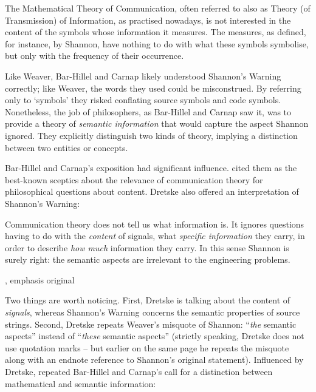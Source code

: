 \documentclass[12pt]{article}
\begin{document}
\begin{myquote}
The Mathematical Theory of Communication, often referred to also as Theory (of Transmission) of Information, as practised nowadays, is not interested in the content of the symbols whose information it measures. The measures, as defined, for instance, by Shannon, have nothing to do with what these symbols symbolise, but only with the frequency of their occurrence.
\par\hspace*{\fill}\citet[147]{bar-hillel1953semantic}
\end{myquote}

\noindent Like Weaver, Bar-Hillel and Carnap likely understood {\sc Shannon's Warning} correctly; like Weaver, the words they used could be misconstrued.
By referring only to `symbols' they risked conflating source symbols and code symbols.
Nonetheless, the job of philosophers, as Bar-Hillel and Carnap saw it, was to provide a theory of \textit{semantic information} that would capture the aspect Shannon ignored.
They explicitly distinguish two kinds of theory, implying a distinction between two entities or concepts.

Bar-Hillel and Carnap's exposition had significant influence.
\citet[p. 241, n.
1]{dretske1981knowledge} cited them as the best-known sceptics about the relevance of communication theory for philosophical questions about content.
Dretske also offered an interpretation of {\sc Shannon's Warning}:

\begin{myquote}
Communication theory does not tell us what information is.
It ignores questions having to do with the \emph{content} of signals, what \emph{specific information} they carry, in order to describe \emph{how much} information they carry.
In this sense Shannon is surely right: the semantic aspects are irrelevant to the engineering problems.
\par\hspace*{\fill}\citet[41]{dretske1981knowledge}, emphasis original
\end{myquote}

\noindent Two things are worth noticing.
First, Dretske is talking about the content of \textit{signals}, whereas {\sc Shannon's Warning} concerns the semantic properties of source strings.
Second, Dretske repeats Weaver's misquote of Shannon: ``\textit{the} semantic aspects'' instead of ``\textit{these} semantic aspects'' (strictly speaking, Dretske does not use quotation marks -- but earlier on the same page he repeats the misquote along with an endnote reference to Shannon's original statement).
Influenced by Dretske, \citet{dennett1983intentional} repeated Bar-Hillel and Carnap's call for a distinction between mathematical and semantic information:
\end{document}

